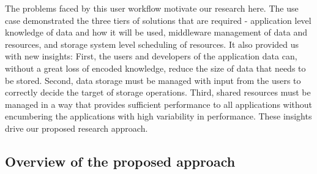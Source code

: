 The problems faced by this user workflow motivate our research here. The use
case demonstrated the three tiers of solutions that are required -
application level knowledge of data and how it will be used, middleware
management of data and resources, and storage system level scheduling of
resources. It also provided us with new insights: First, the users and developers
of the application data can, without a great loss of encoded knowledge,
reduce the size of data that needs to be stored. Second, data storage must
be managed with input from the users to correctly decide the target of
storage operations. Third, shared resources must be managed in a way that
provides sufficient performance to all applications without encumbering the
applications with high variability in performance. 
These insights drive our proposed research approach. 







\subsection{Overview of the proposed approach} 

